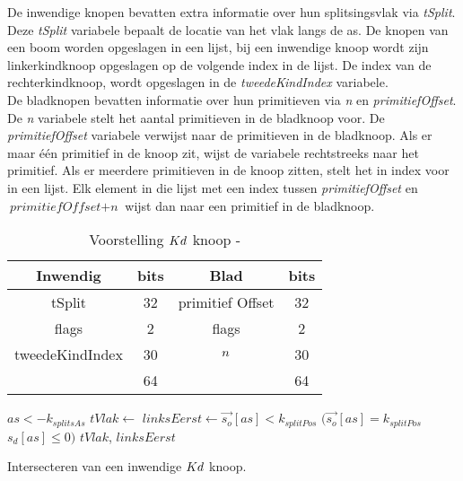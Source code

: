 De inwendige knopen bevatten extra informatie over hun splitsingsvlak via \textit{tSplit}.
Deze \textit{tSplit} variabele bepaalt de locatie van het vlak langs de as.
De knopen van een boom worden opgeslagen in een lijst, bij een inwendige knoop wordt zijn linkerkindknoop opgeslagen op de volgende index in de lijst.
De index van de rechterkindknoop, wordt opgeslagen in de \textit{tweedeKindIndex} variabele.\\

De bladknopen bevatten informatie over hun primitieven via \textit{n} en \textit{primitiefOffset}.
De \textit{n} variabele stelt het aantal primitieven in de bladknoop voor.
De \textit{primitiefOffset} variabele verwijst naar de primitieven in de bladknoop.
Als er maar één primitief in de knoop zit, wijst de variabele rechtstreeks naar het primitief.
Als er meerdere primitieven in de knoop zitten, stelt het in index voor in een lijst.
Elk element in die lijst met een index tussen \textit{primitiefOffset} en $\textit{primitiefOffset} + \textit{n}$ wijst dan naar een primitief in de bladknoop.

\begin{table}
    \centering
    \begin{tabular}{@{}|c|c|c|c|@{}} \toprule      
    Inwendig & bits & Blad & bits \\ \midrule
    tSplit & 32 & primitief Offset & 32 \\
    flags  & 2  &  flags   & 2    \\
    tweedeKindIndex & 30 & $n$ & 30 \\ \hline \hline
    & 64 & & 64    \\ \bottomrule
    \end{tabular}
    \caption[Voorstelling $\symKd$ knoop]{Voorstelling $\symKd$ knoop - \small }
    \label{tab:voorstelling-kd-knoop}
\end{table}        
    
    \begin{dutchalgorithm}
        \begin{algorithmic}       
                \State $as <- k_{splitsAs}$
                \State $tVlak \gets $ 
                \State $linksEerst \gets \vec{s_o}[as] < k_{splitPos}$ \Or $(\vec{s_o}[as] = k_{splitPos}$ \And $s_d[as] \leq 0)$
                \State \Return $tVlak$, $linksEerst$
            \EndFunction
        \end{algorithmic}
        \caption{Intersecteren van een inwendige $\symKd$ knoop.}
    \end{dutchalgorithm}
    

